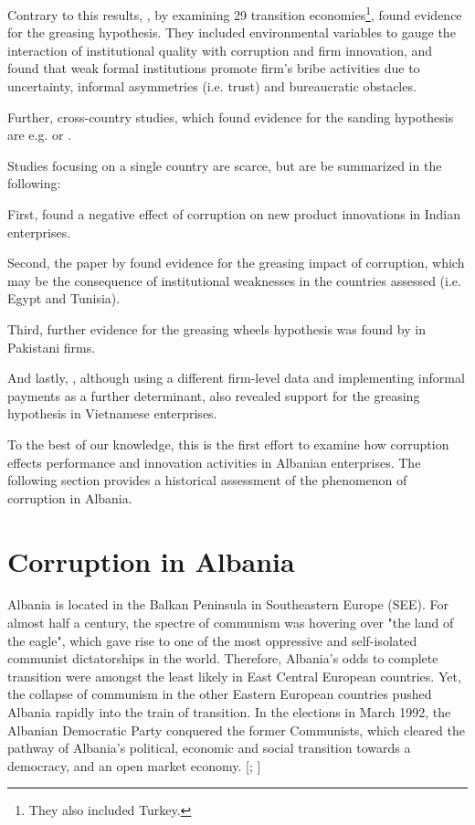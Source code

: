 Contrary to this results, \citet{krammer2013greasing}, by examining 29 transition economies\footnote{They also included Turkey.}, found evidence for the greasing hypothesis. They included environmental variables to gauge the interaction of institutional quality with corruption and firm innovation, and found that weak formal institutions promote firm's bribe activities due to uncertainty, informal asymmetries (i.e. trust) and bureaucratic obstacles.

Further, cross-country studies, which found evidence for the sanding hypothesis are e.g. \cite{paunov2016corruption} or \cite{pirtea2019does}.

Studies focusing on a single country are scarce, but are be summarized in the following:

First, \citet{de_Waldemar_2012} found a negative effect of corruption on new product innovations in Indian enterprises. 

Second, the paper by \citet{goedhuys2016corruption} found evidence for the greasing impact of corruption, which may be the consequence of institutional weaknesses in the countries assessed (i.e. Egypt and Tunisia).

Third, further evidence for the greasing wheels hypothesis was found by \citet{imran2020effect} in Pakistani firms. 

And lastly, \citet{nguyen2016impact}, although using a different firm-level data and implementing informal payments as a further determinant, also revealed support for the greasing hypothesis in Vietnamese enterprises. 

To the best of our knowledge, this is the first effort to examine how corruption effects performance and innovation activities in Albanian enterprises. The following section provides a historical assessment of the phenomenon of corruption in Albania. 

\section{Corruption in Albania}
Albania is located in the Balkan Peninsula in Southeastern Europe (SEE). For almost half a century, the spectre of communism was hovering over "the land of the eagle", which gave rise to one of the most oppressive and self-isolated communist dictatorships in the world. Therefore, Albania's odds to complete transition were amongst the least likely in East Central European countries. Yet, the collapse of communism in the other Eastern European countries pushed Albania rapidly into the train of transition. In the elections in March 1992, the Albanian Democratic Party conquered the former Communists, which cleared the pathway
of Albania's political, economic and social transition towards a democracy, and an open market economy. [\citealp{biberaj2019albania}; \citealp[p. 6]{muco1997economic}]

